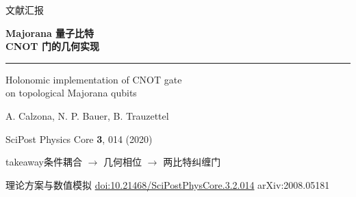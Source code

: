 \documentclass[aspectratio=169,11pt]{beamer}
\newcommand{\source}[1]{{\par\vspace{0.1cm}\fontsize{7.5}{10}\selectfont\color{Muted}#1\par}}
\newcommand{\takeaway}[1]{%
  \begin{beamercolorbox}[wd=\linewidth,sep=0.6em]{takeaway}\small #1\end{beamercolorbox}}
\begin{document}
\begin{frame}[plain,shrink=2]
  \vspace{0.6cm}
  {\color{Teal}\large 文献汇报}\par\vspace{0.4cm}
  {\huge\bfseries Majorana 量子比特\\[0.22cm]CNOT 门的几何实现}\par
  \vspace{0.4cm}
  {\color{Teal}\rule{2.2cm}{2pt}}\par\vspace{0.35cm}
  {\large Holonomic implementation of CNOT gate\\[0.08cm]
  on topological Majorana qubits}\par\vspace{0.4cm}
  A. Calzona, N. P. Bauer, B. Trauzettel\par\vspace{0.15cm}
  {\color{Muted}SciPost Physics Core \textbf{3}, 014 (2020)}\par
  \vspace{0.55cm}
  \takeaway{条件耦合 $\longrightarrow$ 几何相位 $\longrightarrow$ 两比特纠缠门}
  \source{理论方案与数值模拟\quad
  \href{https://doi.org/10.21468/SciPostPhysCore.3.2.014}{doi:10.21468/SciPostPhysCore.3.2.014}
  \quad arXiv:2008.05181}
\end{frame}
\end{document}
